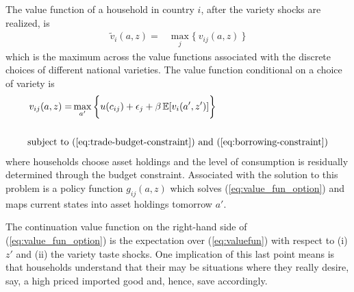 \documentclass[12pt,pdftex]{article}
\begin{document}
\begin{onehalfspacing}
The value function of a household in country $i$, after the variety shocks are realized, is
\begin{align}
\tilde{v}_{i}(a, z) = &  \max_{j} \big  \{ \  v_{ij}(a, z)  \ \big \}
\label{eq:valuefun}
\end{align}
which is the maximum across the value functions associated with the discrete choices of different national varieties. The value function conditional on a choice of variety is
\begin{align}
v_{ij}(a, z) = &  \max_{\ a' \ }\bigg  \{ u(c_{ij}) + \epsilon_{j}  + \beta \, \mathbb{E} [v_{i}(a', z')]  \bigg\}
\label{eq:value_fun_option} \\
\nonumber \\
\mbox{subject to}  \ & (\ref{eq:trade-budget-constraint}) \  \mathrm{and} \ (\ref{eq:borrowing-constraint}) \nonumber
\end{align}
where households choose asset holdings and the level of consumption is residually determined through the budget constraint. Associated with the solution to this problem is a policy function $g_{ij}(a,z)$ which solves (\ref{eq:value_fun_option}) and maps current states into asset holdings tomorrow $a'$.

The continuation value function on the right-hand side of (\ref{eq:value_fun_option}) is the expectation over (\ref{eq:valuefun}) with respect to (i) $z'$ and (ii) the variety taste shocks. One implication of this last point means is that households understand that their may be situations where they really desire, say, a high priced imported good and, hence, save accordingly.


\end{onehalfspacing}
\end{document}

